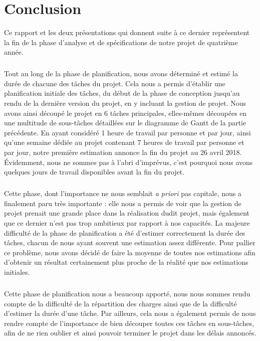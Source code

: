 \chapter{Conclusion}

Ce rapport et les deux présentations qui donnent suite à ce dernier représentent la fin
de la phase d’analyse et de spécifications de notre projet de quatrième année.

\paragraph{}

Tout au long de la phase de planification, nous avons déterminé et estimé la durée de chacune des tâches du projet. Cela nous a permis d’établir une planification initiale des tâches, du début de la phase de conception jusqu’au rendu de la dernière version du projet, en y incluant la gestion de projet. Nous avons ainsi découpé le projet en 6 tâches principales, elles-mêmes découpées en une multitude de sous-tâches détaillées sur le diagramme de Gantt de la partie précédente. En ayant considéré 1 heure de travail par personne et par jour, ainsi qu’une semaine dédiée au projet contenant 7 heures de travail par personne et par jour, notre première estimation annonce la fin du projet au 26 avril 2018. Évidemment, nous ne sommes pas à l’abri d’imprévus, c’est pourquoi nous avons quelques jours de travail disponibles avant la fin du projet.

\paragraph{}

Cette phase, dont l’importance ne nous semblait \textit{a priori} pas capitale, nous a finalement paru très importante : elle nous a permis de voir que la gestion de projet prenait une grande place dans la réalisation dudit projet, mais également que ce dernier n’est pas trop ambitieux par rapport à nos capacités. La majeure difficulté de la phase de planification a été d’estimer correctement la durée des tâches, chacun de nous ayant souvent une estimation assez différente. Pour pallier ce problème, nous avons décidé de faire la moyenne de toutes nos estimations afin d’obtenir un résultat certainement plus proche de la réalité que nos estimations initiales.

\paragraph{}

Cette phase de planification nous a beaucoup apporté, nous nous sommes rendu compte de la difficulté de la répartition des charges ainsi que de la difficulté d’estimer la durée d’une tâche. Par ailleurs, cela nous a également permis de nous rendre compte de l’importance de bien découper toutes ces tâches en sous-tâches, afin de ne rien oublier et ainsi pouvoir terminer le projet dans les délais annoncés.
